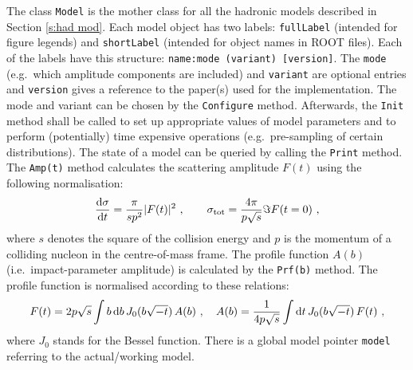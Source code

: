\documentclass[preprint,12pt]{elsarticle}
\def\d{{\rm d}}
\begin{document}
The class {\tt Model} is the mother class for all the hadronic models described in Section \ref{s:had mod}. Each model object has two labels: {\tt fullLabel} (intended for figure legends) and {\tt shortLabel} (intended for object names in ROOT files). Each of the labels have this structure: {\tt name:mode (variant) [version]}. The {\tt mode} (e.g.~which amplitude components are included) and {\tt variant} are optional entries and {\tt version} gives a reference to the paper(s) used for the implementation. The mode and variant can be chosen by the {\tt Configure} method. Afterwards, the {\tt Init} method shall be called to set up appropriate values of model parameters and to perform (potentially) time expensive operations (e.g.~pre-sampling of certain distributions). The state of a model can be queried by calling the {\tt Print} method. The {\tt Amp(t)} method calculates the scattering amplitude $F(t)$ using the following normalisation:
\begin{equation}
{\d\sigma\over\d t} = {\pi\over s p^2} |F(t)|^2\ ,\qquad \sigma_{\rm tot} = {4\pi\over p\sqrt s} \Im F(t = 0)\ ,
\end{equation}
where $s$ denotes the square of the collision energy and $p$ is the momentum of a colliding nucleon in the centre-of-mass frame. The profile function $A(b)$ (i.e.~impact-parameter amplitude) is calculated by the {\tt Prf(b)} method. The profile function is normalised according to these relations:
\begin{equation}
F(t) = 2 p \sqrt s \int b\, \d b\, J_0(b \sqrt{-t})\, A(b)\ ,\quad A(b) = {1\over 4p\sqrt s} \int \d t\, J_0(b\sqrt{-t})\,F(t)\ ,
\end{equation}
where $J_0$ stands for the Bessel function. There is a global model pointer {\tt model} referring to the actual/working model.
\end{document}
